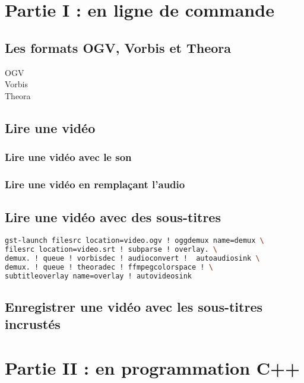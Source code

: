 \documentclass[a4paper, 11pt]{article}
\begin{document}
	\maketitle
	\section{Partie I : en ligne de commande}
	\subsection{Les formats OGV, Vorbis et Theora}
	\begin{description}
		\item[OGV]
		\item[Vorbis] 
		\item[Theora] 
	\end{description}
	\subsection{Lire une vidéo}
	\subsubsection{Lire une vidéo avec le son}
	\subsubsection{Lire une vidéo en remplaçant l'audio}
	\subsection{Lire une vidéo avec des sous-titres}
\begin{lstlisting}[language=Bash]	
gst-launch filesrc location=video.ogv ! oggdemux name=demux \ 
filesrc location=video.srt ! subparse ! overlay. \
demux. ! queue ! vorbisdec ! audioconvert !  autoaudiosink \
demux. ! queue ! theoradec ! ffmpegcolorspace ! \
subtitleoverlay name=overlay ! autovideosink
\end{lstlisting}
	\subsection{Enregistrer une vidéo avec les sous-titres incrustés}
	\section{Partie II : en programmation C++}
	\subsection{}
	\subsection{}
	\subsection{}
	\subsection{}
	\subsection{}
\end{document}
